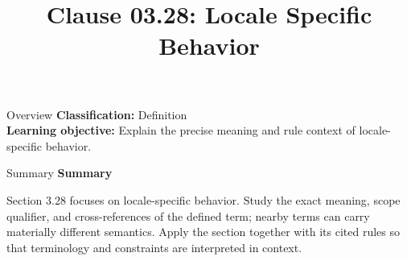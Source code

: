 \documentclass[10pt,letterpaper]{article}
\title{Clause 03.28: Locale Specific Behavior}
\author{}
\date{}
\begin{document}
\maketitle
\begin{CornellOverviewBox}{Overview}
\textbf{Classification:} Definition\\[2pt]
\textbf{Learning objective:} Explain the precise meaning and rule context of locale-specific behavior.
\end{CornellOverviewBox}\begin{CornellSummaryBox}{Summary}
{\sffamily\bfseries\color{Accent} Summary}\par\vspace{3pt}Section 3.28 focuses on locale-specific behavior. Study the exact meaning, scope qualifier, and cross-references of the defined term; nearby terms can carry materially different semantics. Apply the section together with its cited rules so that terminology and constraints are interpreted in context.
\end{CornellSummaryBox}
\end{document}
